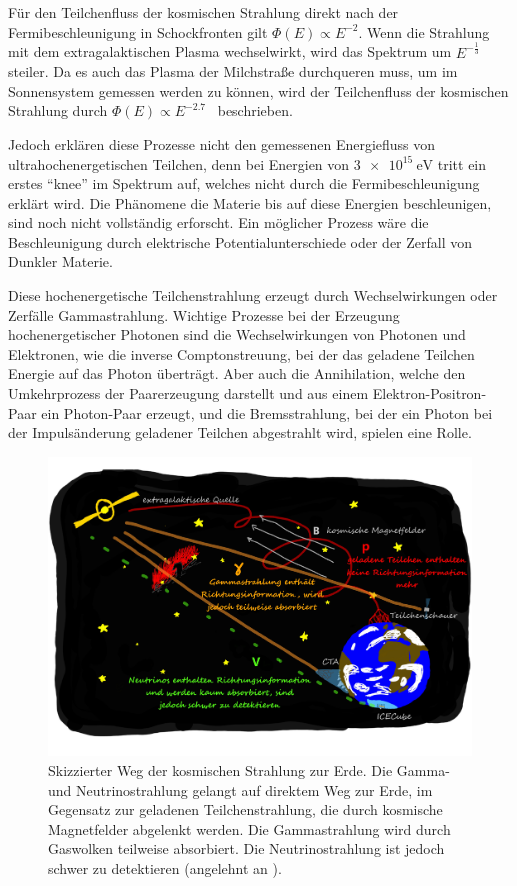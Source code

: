 Für den Teilchenfluss der kosmischen Strahlung direkt nach der Fermibeschleunigung in Schockfronten gilt
$\Phi(E)\propto E^{-2}$.
Wenn die Strahlung mit dem extragalaktischen Plasma wechselwirkt, wird das Spektrum um $E^{-\frac{1}{3}}$ steiler.
Da es auch das Plasma der Milchstraße durchqueren muss, um im Sonnensystem gemessen werden zu können, wird
der Teilchenfluss der kosmischen Strahlung durch $\Phi(E) \propto E^{-2.7}$~\cite[5]{Cosmic_rays} beschrieben.

Jedoch erklären diese Prozesse nicht den gemessenen Energiefluss von ultrahochenergetischen Teilchen, denn bei Energien von $\SI{3e15}{\eV}$ tritt ein erstes
\enquote{knee} im Spektrum auf, welches nicht durch die Fermibeschleunigung erklärt wird.
Die Phänomene die Materie bis auf diese Energien beschleunigen, sind noch nicht vollständig erforscht.
Ein möglicher Prozess wäre die Beschleunigung durch elektrische Potentialunterschiede oder der Zerfall von Dunkler Materie.

Diese hochenergetische Teilchenstrahlung erzeugt durch Wechselwirkungen oder Zerfälle Gammastrahlung.
Wichtige Prozesse bei der Erzeugung hochenergetischer Photonen sind die Wechselwirkungen von Photonen und Elektronen, wie
die inverse Comptonstreuung, bei der das geladene Teilchen Energie auf das Photon
überträgt. Aber auch die Annihilation, welche den Umkehrprozess der Paarerzeugung darstellt und aus einem Elektron-Positron-Paar
ein Photon-Paar erzeugt, und die Bremsstrahlung, bei der ein Photon bei der Impulsänderung geladener Teilchen abgestrahlt wird, spielen eine Rolle.

\begin{figure}
  \includegraphics[width=\textwidth]{Plots/Folie5.pdf}
  \centering
  \caption{Skizzierter Weg der kosmischen Strahlung zur Erde. Die Gamma- und Neutrinostrahlung gelangt auf direktem Weg zur Erde, im Gegensatz
            zur geladenen Teilchenstrahlung, die durch kosmische Magnetfelder abgelenkt werden. Die Gammastrahlung wird durch Gaswolken teilweise
            absorbiert. Die Neutrinostrahlung ist jedoch schwer zu detektieren (angelehnt an \cite{Folie5}).}
  \label{abb:Folie5}
\end{figure}

